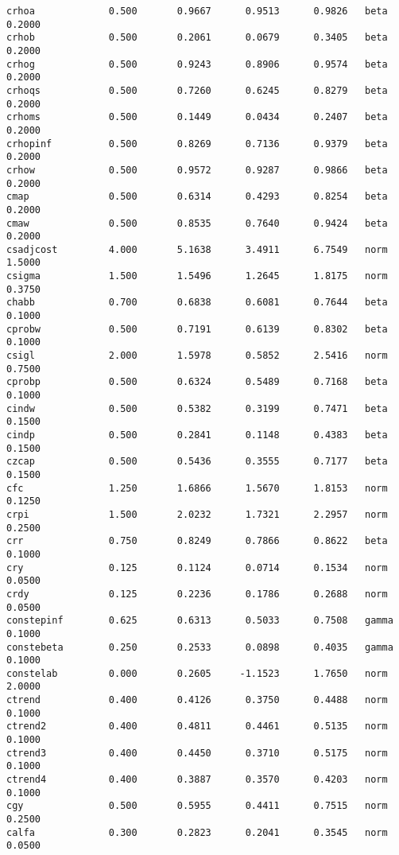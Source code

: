 \documentclass[]{article}
\begin{document}
\begin{verbatim}
crhoa             0.500       0.9667      0.9513      0.9826   beta        0.2000
crhob             0.500       0.2061      0.0679      0.3405   beta        0.2000
crhog             0.500       0.9243      0.8906      0.9574   beta        0.2000
crhoqs            0.500       0.7260      0.6245      0.8279   beta        0.2000
crhoms            0.500       0.1449      0.0434      0.2407   beta        0.2000
crhopinf          0.500       0.8269      0.7136      0.9379   beta        0.2000
crhow             0.500       0.9572      0.9287      0.9866   beta        0.2000
cmap              0.500       0.6314      0.4293      0.8254   beta        0.2000
cmaw              0.500       0.8535      0.7640      0.9424   beta        0.2000
csadjcost         4.000       5.1638      3.4911      6.7549   norm        1.5000
csigma            1.500       1.5496      1.2645      1.8175   norm        0.3750
chabb             0.700       0.6838      0.6081      0.7644   beta        0.1000
cprobw            0.500       0.7191      0.6139      0.8302   beta        0.1000
csigl             2.000       1.5978      0.5852      2.5416   norm        0.7500
cprobp            0.500       0.6324      0.5489      0.7168   beta        0.1000
cindw             0.500       0.5382      0.3199      0.7471   beta        0.1500
cindp             0.500       0.2841      0.1148      0.4383   beta        0.1500
czcap             0.500       0.5436      0.3555      0.7177   beta        0.1500
cfc               1.250       1.6866      1.5670      1.8153   norm        0.1250
crpi              1.500       2.0232      1.7321      2.2957   norm        0.2500
crr               0.750       0.8249      0.7866      0.8622   beta        0.1000
cry               0.125       0.1124      0.0714      0.1534   norm        0.0500
crdy              0.125       0.2236      0.1786      0.2688   norm        0.0500
constepinf        0.625       0.6313      0.5033      0.7508   gamma       0.1000
constebeta        0.250       0.2533      0.0898      0.4035   gamma       0.1000
constelab         0.000       0.2605     -1.1523      1.7650   norm        2.0000
ctrend            0.400       0.4126      0.3750      0.4488   norm        0.1000
ctrend2           0.400       0.4811      0.4461      0.5135   norm        0.1000
ctrend3           0.400       0.4450      0.3710      0.5175   norm        0.1000
ctrend4           0.400       0.3887      0.3570      0.4203   norm        0.1000
cgy               0.500       0.5955      0.4411      0.7515   norm        0.2500
calfa             0.300       0.2823      0.2041      0.3545   norm        0.0500


\end{verbatim}
\end{document}
